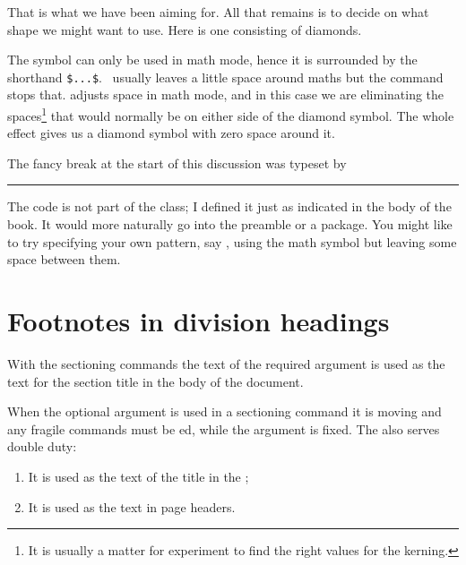     That is what we have been aiming for. All that
remains is to decide on what shape we might want to use. Here is one
consisting of diamonds.
\begin{lcode}
\makeatletter
\newcommand{\diamonds}{\m@th$\mkern-.6mu \diamond \mkern-.6mu$}
\makeatother
\end{lcode}
The \cmd{\diamond} symbol can only be used in math mode, hence it
is surrounded by the shorthand \verb?$...$?. \tx\ usually leaves a little
space around maths but the \cmd{\m@th} command stops that. \cmd{\mkern}
adjusts space in math mode, and in this case we are eliminating
the spaces\footnote{It is usually a matter for experiment to find
the right values for the kerning.\label{fn:kerning}}
that would normally be on either
side of the diamond symbol.
The whole effect gives us a diamond symbol with zero space around it.

    The fancy break at the start of this discussion was typeset by
\begin{lcode}
\fancybreak{\chain{\diamonds}{0.25\textwidth}}
\end{lcode}
The code is not part of the  class; I defined it just
as indicated in the body of the book. It would more naturally go
into the preamble or a package. You might like to try specifying your
own pattern, say , using the \cmd{\club} math symbol but leaving
some space between them.



\section{Footnotes in division headings}


    With the sectioning commands the text of the required argument
 is used as the text for the section title in the body
of the document.

    When the optional argument  is used in a sectioning
command it is moving and any fragile
commands must be \cmd{\protect}ed,
while the  argument is fixed. The  also
serves double duty:
\begin{enumerate}
\item It is used as the text of the title in the \toc;
\item It is used as the text in page headers.
\end{enumerate}

